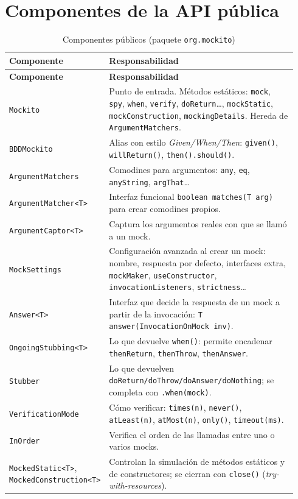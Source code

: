 \documentclass[11pt,a4paper,oneside]{report}
\newcommand{\code}[1]{\texttt{#1}}
\begin{document}
\section{Componentes de la API pública}
\begin{longtable}{p{0.27\linewidth}p{0.67\linewidth}}
\caption{Componentes públicos (paquete \code{org.mockito})}\\
\toprule
\textbf{Componente} & \textbf{Responsabilidad}\\
\midrule
\endfirsthead
\toprule
\textbf{Componente} & \textbf{Responsabilidad}\\
\midrule
\endhead
\code{Mockito} & Punto de entrada. Métodos estáticos: \code{mock}, \code{spy}, \code{when}, \code{verify}, \code{doReturn}\ldots, \code{mockStatic}, \code{mockConstruction}, \code{mockingDetails}. Hereda de \code{ArgumentMatchers}.\\
\code{BDDMockito} & Alias con estilo \emph{Given/When/Then}: \code{given()}, \code{willReturn()}, \code{then().should()}.\\
\code{ArgumentMatchers} & Comodines para argumentos: \code{any}, \code{eq}, \code{anyString}, \code{argThat}\ldots\\
\code{ArgumentMatcher<T>} & Interfaz funcional \code{boolean matches(T arg)} para crear comodines propios.\\
\code{ArgumentCaptor<T>} & Captura los argumentos reales con que se llamó a un mock.\\
\code{MockSettings} & Configuración avanzada al crear un mock: nombre, respuesta por defecto, interfaces extra, \code{mockMaker}, \code{useConstructor}, \code{invocationListeners}, \code{strictness}\ldots\\
\code{Answer<T>} & Interfaz que decide la respuesta de un mock a partir de la invocación: \code{T answer(InvocationOnMock inv)}.\\
\code{OngoingStubbing<T>} & Lo que devuelve \code{when()}: permite encadenar \code{thenReturn}, \code{thenThrow}, \code{thenAnswer}.\\
\code{Stubber} & Lo que devuelven \code{doReturn/doThrow/doAnswer/doNothing}; se completa con \code{.when(mock)}.\\
\code{VerificationMode} & Cómo verificar: \code{times(n)}, \code{never()}, \code{atLeast(n)}, \code{atMost(n)}, \code{only()}, \code{timeout(ms)}.\\
\code{InOrder} & Verifica el orden de las llamadas entre uno o varios mocks.\\
\code{MockedStatic<T>}, \code{MockedConstruction<T>} & Controlan la simulación de métodos estáticos y de constructores; se cierran con \code{close()} (\emph{try-with-resources}).\\

\end{longtable}
\end{document}
